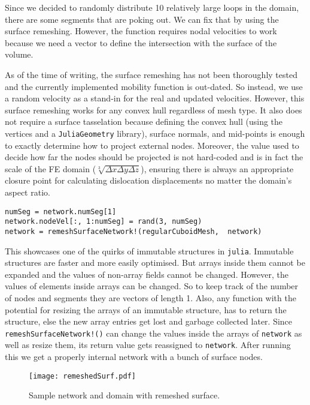 Since we decided to randomly distribute 10 relatively large loops in the domain, there are some segments that are poking out. We can fix that by using the surface remeshing. However, the function requires nodal velocities to work because we need a vector to define the intersection with the surface of the volume.

As of the time of writing, the surface remeshing has not been thoroughly tested and the currently implemented mobility function is out-dated. So instead, we use a random velocity as a stand-in for the real and updated velocities. However, this surface remeshing works for any convex hull regardless of mesh type. It also does not require a surface tasselation because defining the convex hull (using the vertices and a \texttt{JuliaGeometry} library), surface normals, and mid-points is enough to exactly determine how to project external nodes. Moreover, the value used to decide how far the nodes should be projected is not hard-coded and is in fact the scale of the FE domain ($\sqrt[3]{\Delta x \Delta y \Delta z}$), ensuring there is always an appropriate closure point for calculating dislocation displacements no matter the domain's aspect ratio.
\begin{verbatim}
numSeg = network.numSeg[1]
network.nodeVel[:, 1:numSeg] = rand(3, numSeg)
network = remeshSurfaceNetwork!(regularCuboidMesh,  network)
\end{verbatim}
This showcases one of the quirks of immutable structures in \texttt{julia}. Immutable structures are faster and more easily optimised. But arrays inside them cannot be expanded and the values of non-array fields cannot be changed. However, the values of elements inside arrays can be changed. So to keep track of the number of nodes and segments they are vectors of length 1. Also, any function with the potential for resizing the arrays of an immutable structure, has to return the structure, else the new array entries get lost and garbage collected later. Since \texttt{remeshSurfaceNetwork!()} can change the values inside the arrays of \texttt{network} as well as resize them, its return value gets reassigned to \texttt{network}. After running this we get a properly internal network with a bunch of surface nodes.
\begin{figure}
    \centering
    \texttt{[image: remeshedSurf.pdf]}
    \caption[Sample network and domain with remeshed surface.]{Sample network and domain with remeshed surface.}
\end{figure}

